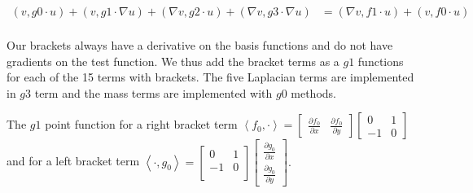 \documentclass[10pt]{article}
\begin{document}
\begin{equation*}
  \begin{aligned}
   \left(  v,  g0 \cdot u \right)  +\left(  v,  g1 \cdot\nabla u \right) + \left(  \nabla v,  g2 \cdot u \right)  +\left(  \nabla v,  g3 \cdot\nabla u \right)   &=  \left( \nabla v, f1 \cdot u \right) + \left( v, f0 \cdot u \right) \\
  \end{aligned}
\end{equation*}

Our brackets always have a derivative on the basis functions and do not have gradients on the test function.
We thus add the bracket terms as a $g1$ functions for each of the 15 terms with brackets.
The five Laplacian terms are implemented in $g3$ term and the mass terms are implemented with $g0$ methods.

The $g1$ point function for a right bracket term 
$
\left \langle f_0, \cdot  \right \rangle = \begin{bmatrix}  \frac{\partial f_0}{\partial x} & \frac{\partial f_0}{\partial y}  \end{bmatrix} \begin{bmatrix}
0 & 1 \\ 
-1 & 0
\end{bmatrix}
$ and for a left bracket term $
\left \langle \cdot, g_0  \right \rangle = \begin{bmatrix}
0 & 1 \\ 
-1 & 0 \\
\end{bmatrix}
\begin{bmatrix}  \frac{\partial g_0}{\partial x} \\ \frac{\partial g_0}{\partial y}  \end{bmatrix}.
$
\end{document}
